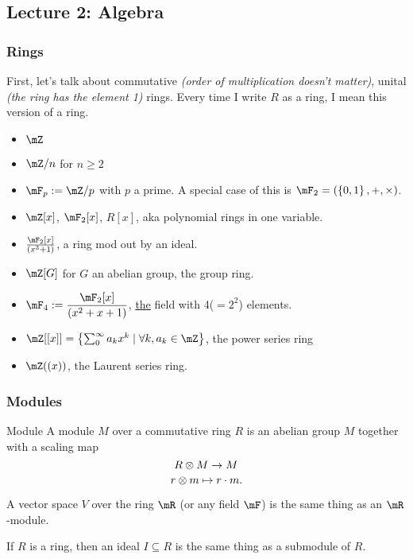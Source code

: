 \newpage

\subsection{Lecture 2: Algebra}

\subsubsection{Rings}
First, let's talk about commutative \emph{(order of multiplication doesn't matter)}, unital \emph{(the ring has the element 1)} rings. Every time I write $R$ as a ring, I mean this version of a ring. 
\begin{example}{}{}
    \begin{itemize}
        \item $\mZ$
        \item $\mZ/n$ for $n\geq 2$
        \item $\mF_p:=\mZ/p$ with $p$ a prime. A special case of this is $\mF_2 = (\sets{0,1},+,\times)$. 
        \item $\mZ[x]$, $\mF_2[x]$, $R[x]$, aka polynomial rings in one variable. 
        \item $\frac{\mF_2[x]}{(x^3+1)}$, a ring mod out by an ideal. 
        \item $\mZ[G]$ for $G$ an abelian group, the group ring. 
        \item $\ds\mF_4:=\frac{\mF_2[x]}{(x^2+x+1)}$, \ul{the} field with 4($=2^2$) elements. 
        \item $\mZ[[x]] = \sets{\sum_0^\infty a_k x^k\mid \forall k, a_k\in \mZ}$, the power series ring
        \item $\mZ((x))$, the Laurent series ring. 
    \end{itemize}
\end{example}
\subsubsection{Modules}
\begin{definition}{Module}
    A {module} $M$ over a commutative ring $R$ is an abelian group $M$ together with a scaling map $$R\otimes M\to M$$ $$r\otimes m\mapsto r\cdot m.$$
\end{definition}
\begin{example}{}{}
    A vector space $V$ over the ring $\mR$ (or any field $\mF$) is the same thing as an $\mR$-module. 
\end{example}
\begin{example}{}{}
    If $R$ is a ring, then an ideal $I\subseteq R$ is the same thing as a submodule of $R$.
\end{example}
